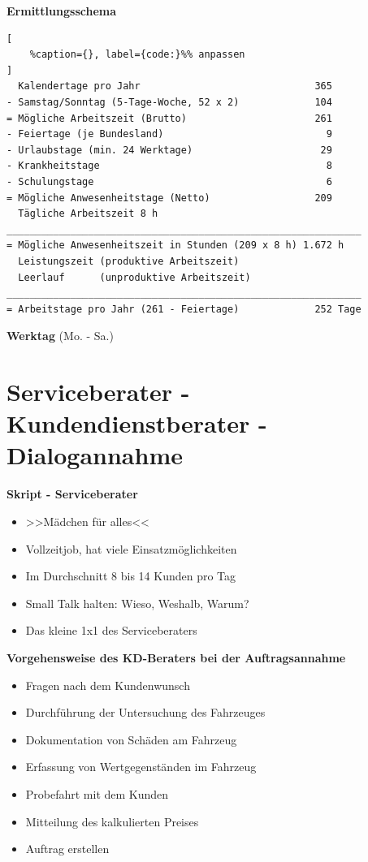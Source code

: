 \textbf{Ermittlungsschema}

\lstset{language=Bash}%
\begin{lstlisting}[
	%caption={}, label={code:}%% anpassen
]
  Kalendertage pro Jahr                              365
- Samstag/Sonntag (5-Tage-Woche, 52 x 2)             104
= Mögliche Arbeitszeit (Brutto)                      261
- Feiertage (je Bundesland)                            9
- Urlaubstage (min. 24 Werktage)                      29
- Krankheitstage                                       8
- Schulungstage                                        6 
= Mögliche Anwesenheitstage (Netto)                  209
  Tägliche Arbeitszeit 8 h 
_____________________________________________________________
= Mögliche Anwesenheitszeit in Stunden (209 x 8 h) 1.672 h
  Leistungszeit (produktive Arbeitszeit)
  Leerlauf      (unproduktive Arbeitszeit)
_____________________________________________________________
= Arbeitstage pro Jahr (261 - Feiertage)             252 Tage
\end{lstlisting}

\textbf{Werktag} (Mo. - Sa.)

\newpage

\section{Serviceberater - Kundendienstberater -
Dialogannahme}\label{serviceberater-kundendienstberater-dialogannahme}

\textbf{Skript - Serviceberater}

\begin{itemize}
\item
  >>Mädchen für alles<<
\item
  Vollzeitjob, hat viele Einsatzmöglichkeiten
\item
  Im Durchschnitt 8 bis 14 Kunden pro Tag
\item
  Small Talk halten: Wieso, Weshalb, Warum?
\item
  Das kleine 1x1 des Serviceberaters
\end{itemize}

\textbf{Vorgehensweise des KD-Beraters bei der Auftragsannahme}

\begin{itemize}
\item
  Fragen nach dem Kundenwunsch
\item
  Durchführung der Untersuchung des Fahrzeuges
\item
  Dokumentation von Schäden am Fahrzeug
\item
  Erfassung von Wertgegenständen im Fahrzeug
\item
  Probefahrt mit dem Kunden
\item
  Mitteilung des kalkulierten Preises
\item
  Auftrag erstellen
\end{itemize}


